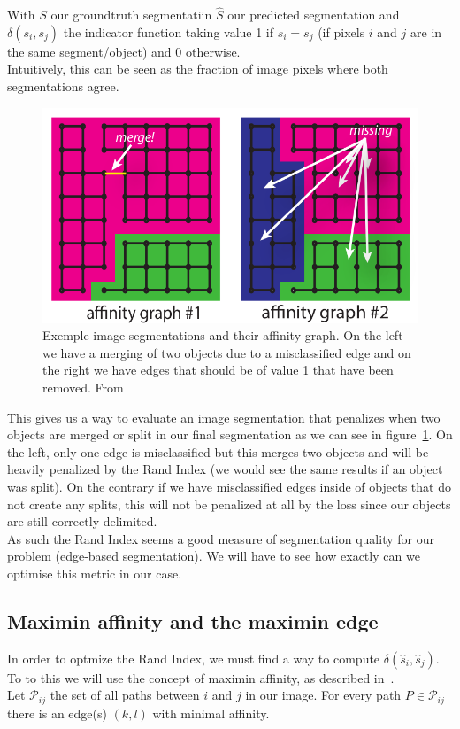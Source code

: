 With $S$ our groundtruth segmentatiin $\hat{S}$ our predicted segmentation and
$\delta(s_i,s_j)$ the indicator function taking value 1 if $s_i = s_j$ (if
pixels $i$ and $j$ are in the same segment/object) and 0 otherwise.\\
Intuitively, this can be seen as the fraction of image pixels where both
segmentations agree.

\begin{figure}[!htbp]
	\centering
	\includegraphics[width=0.45\linewidth]{./images/affinty_graphs.png}
	\caption{Exemple image segmentations and their affinity graph. On the left
	we have a merging of two objects due to a misclassified edge and on the
right we have edges that should be of value 1 that have been removed. From~\cite{turaga_maximin_2009}}%
	\label{fig:affinity_graphs}
\end{figure}

This gives us a way to evaluate an image segmentation that penalizes when two
objects are merged or split in our final segmentation as we can see in
figure~\ref{fig:affinity_graphs}. On the left, only one edge is misclassified
but this merges two objects and will be heavily penalized by the Rand Index (we
would see the same results if an object was split). On the contrary if we have
misclassified edges inside of objects that do not create any splits, this will
not be penalized at all by the loss since our objects are still correctly
delimited.\\

As such the Rand Index seems a good measure of segmentation quality for our
problem (edge-based segmentation). We will have to see how exactly can we
optimise this metric in our case.

\subsection{Maximin affinity and the maximin edge}

In order to optmize the Rand Index, we must find a way to compute
$\delta(\hat{s}_i,\hat{s}_j)$. To to this we will use the concept of maximin
affinity, as described in~\cite{turaga_maximin_2009}.\\
Let $\mathcal{P}_{ij}$ the set of all paths between $i$ and $j$ in our image.
For every path $P\in\mathcal{P}_{ij}$ there is an edge(s) $(k,l)$ with minimal
affinity.\\

